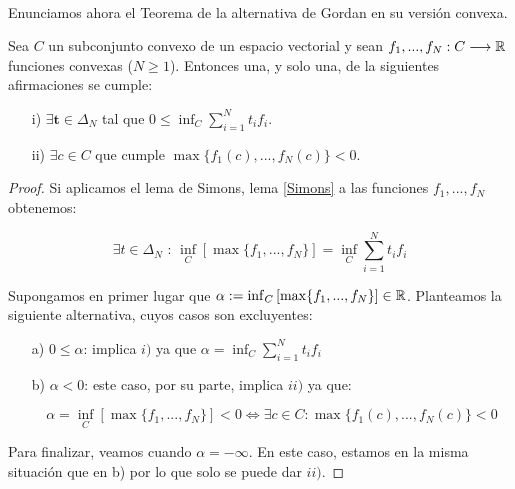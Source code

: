 	\paragraph{}Enunciamos ahora el Teorema de la alternativa de Gordan en su versión convexa.
	
	\begin{teoremaBox}\label{Gordan}
		Sea $ C $ un subconjunto convexo de un espacio vectorial y sean $ f_1,...,f_N : C \longrightarrow \mathbb{R} $ funciones convexas ($ N \geq 1 $). Entonces una, y solo una, de la siguientes afirmaciones se cumple:
		\begin{itemize}
			\item[i)] $ \exists \mathbf{t} \in \Delta_N $ tal que $ 0 \leq \inf_{C}  \sum_{i=1}^{N}{t_i f_i}$.
			\item[ii)] $ \exists c \in C $ que cumple $ \max \lbrace f_1(c), ..., f_N(c) \rbrace < 0 $.
		\end{itemize}
	\end{teoremaBox}
	\begin{proof}
		Si aplicamos el lema de Simons, lema \ref{Simons} a las funciones $ f_1,...,f_N $ obtenemos:
		
		\begin{equation*}
			\exists t \in \Delta_N \text{ : } \inf_{ C}\left[ \max \lbrace f_1, ..., f_N \rbrace \right] = \inf_{C} \sum_{i=1}^{N}t_i f_i
		\end{equation*}
		
		Supongamos en primer lugar que $ \alpha := \inf_{C}\left[ \max \lbrace f_1, ..., f_N \rbrace \right] \in \mathbb{R} $. Planteamos la siguiente alternativa, cuyos casos son excluyentes:
		\begin{itemize}
			\item[a)] $ 0 \leq \alpha $: implica $ i) $ ya que $ \alpha = \inf_{C} \sum_{i=1}^{N}t_i f_i $ 
			\item[b)] $ \alpha < 0 $: este caso, por su parte, implica $ ii) $ ya que:
			
			\begin{equation*}
				\alpha = \inf_{C}\left[ \max \lbrace f_1, ..., f_N \rbrace \right] < 0 \Longleftrightarrow \exists c \in C  : \max \lbrace f_1(c), ..., f_N(c) \rbrace < 0 
			\end{equation*}  
		\end{itemize}
	
		Para finalizar, veamos cuando $ \alpha =-\infty $. En este caso, estamos en la misma situación que en b) por lo que solo se puede dar $ ii) $.
	\end{proof}

